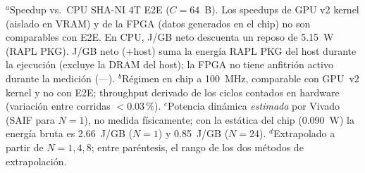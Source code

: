 \begin{table}[htbp]
  \caption{Comparación cruzada de rendimiento y eficiencia energética ($C=64$~B)}
  \label{tab:comparison}
  \centering
  \setlength{\tabcolsep}{3.5pt}
  \par\vspace{2pt}
  \begin{minipage}{\columnwidth}\footnotesize\raggedright
  $^a$Speedup vs.~CPU SHA-NI 4T E2E ($C=64$~B). Los speedups de GPU v2 kernel (aislado en VRAM) y de la FPGA (datos generados en el chip) no son comparables con E2E. En CPU, J/GB neto descuenta un reposo de 5.15~W (RAPL PKG). J/GB neto (+host) suma la energía RAPL PKG del host durante la ejecución (excluye la DRAM del host); la FPGA no tiene anfitrión activo durante la medición (---).
  $^b$Régimen en chip a 100~MHz, comparable con GPU~v2 kernel y no con E2E; throughput derivado de los ciclos contados en hardware (variación entre corridas $<0.03$\,\%).
  $^{c}$Potencia dinámica \emph{estimada} por Vivado (SAIF para $N=1$), no medida físicamente; con la estática del chip (0.090~W) la energía bruta es 2.66~J/GB ($N=1$) y 0.85~J/GB ($N=24$). $^{d}$Extrapolado a partir de $N=1,4,8$; entre paréntesis, el rango de los dos métodos de extrapolación.
  \end{minipage}
\end{table}
